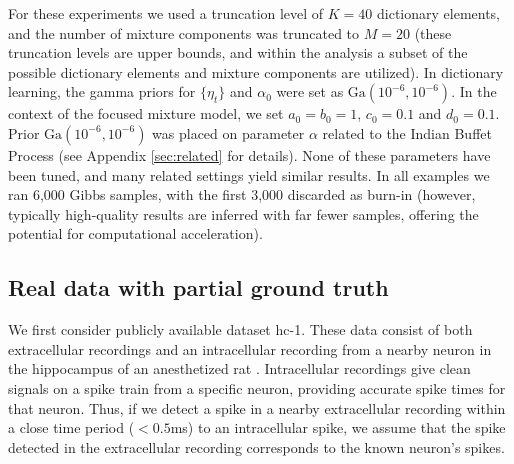 \documentclass[journal]{IEEEtran}
\begin{document}
For these experiments we used a truncation level of
$K=40$ dictionary elements, and the number of mixture components was
truncated to $M=20$ (these truncation levels are upper bounds, and within the analysis a subset of the possible dictionary elements and mixture components are utilized).  In dictionary learning, the gamma priors for
$\{\eta_t\}$ and $\alpha_0$ were set as
$\mbox{Ga}(10^{-6},10^{-6})$. In the context of the {focused mixture model}, we set $a_0=b_0=1$, $c_0=0.1$ and
$d_0=0.1$. Prior $\mbox{Ga}(10^{-6},10^{-6})$ was placed on
parameter $\alpha$ related to the {Indian Buffet Process (see Appendix}  \ref{sec:related} {for details)}. None of these parameters have
been tuned, and many related settings yield similar results. In all
examples we ran 6,000 Gibbs samples, with the first 3,000 discarded
as burn-in (however, typically high-quality results are inferred with far fewer samples, offering the potential for computational acceleration).



\subsection{Real data with partial ground truth} 
\label{sec:truth}
We
first consider publicly available dataset
hc-1. These data consist of both
extracellular recordings and an intracellular recording from a
nearby neuron in the hippocampus of an anesthetized rat
\cite{Henze2000}.  Intracellular recordings give clean signals on a
spike train from a specific neuron, providing accurate spike times for
that neuron.  Thus, if we detect a spike in a nearby extracellular
recording within a close time period ($<0.5$ms) to an intracellular
spike, we assume that the spike detected in the extracellular
recording corresponds to the known neuron's spikes.
\end{document}
